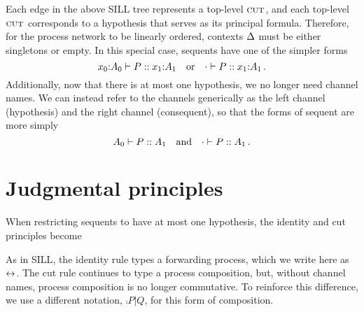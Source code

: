 \documentclass{article}
\begin{document}
Each edge in the above \ac{SILL} tree represents a top-level $\cut{}$, and each top-level $\cut{}$ corresponds to a hypothesis that serves as its principal formula.
Therefore, for the process network to be linearly ordered, contexts $\Delta$ must be either singletons or empty.
In this special case, sequents have one of the simpler forms
\begin{equation*}
  x_0{:}A_0 \vdash P :: x_1{:}A_1
  \quad\text{or}\quad
  \cdot \vdash P :: x_1{:}A_1
  \,.
\end{equation*}
Additionally, now that there is at most one hypothesis, we no longer need channel names.
We can instead refer to the channels generically as the left channel (hypothesis) and the right channel (consequent), so that the forms of sequent are more simply
\begin{equation*}
  A_0 \vdash P :: A_1
  \quad\text{and}\quad
  \cdot \vdash P :: A_1
  \,.
\end{equation*}




\section{Judgmental principles}\label{sec:judeg-princ}

When restricting sequents to have at most one hypothesis, the identity and cut principles become

As in \ac{SILL}, the identity rule types a forwarding process, which we write here as $\mathord{\leftrightarrow}$.
The cut rule continues to type a process composition, but, without channel names, process composition is no longer commutative.
To reinforce this difference, we use a different notation, $\comp{P | Q}$, for this form of composition.
\end{document}
